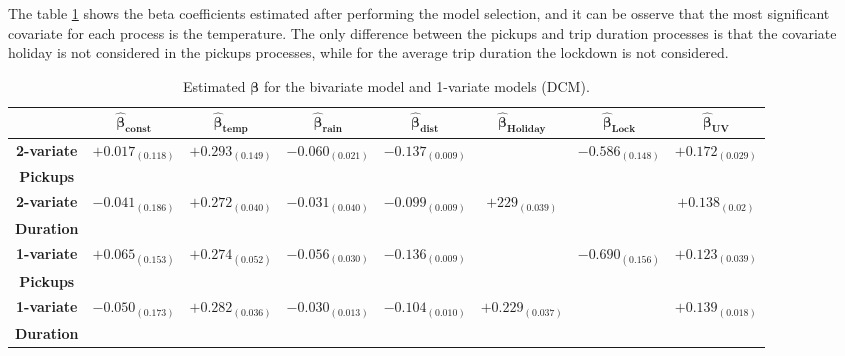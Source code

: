 The table \ref{beta coefficients} shows the beta coefficients estimated after performing the model selection, and it can be osserve that the most significant covariate for each process is the temperature. The only difference between the pickups and trip duration processes is that the covariate holiday is not considered in the pickups processes, while for the average trip duration the lockdown is not considered.
 \begin{table}[h!]
	\centering
	\renewcommand\arraystretch{1.3}
	\begin{tabular}{c|c|c|c|c|c|c|c}
		\hline
		\textit{} & $\boldsymbol{\hat{\beta}_{const}}$  & $\boldsymbol{\hat{\beta}_{temp}}$ & $\boldsymbol{\hat{\beta}_{rain}}$ & $\boldsymbol{\hat{\beta}_{dist}}$ & $\boldsymbol{\hat{\beta}_{Holiday}}$ & $\boldsymbol{\hat{\beta}_{Lock}}$ & $\boldsymbol{\hat{\beta}_{UV}}$ \\
		\hline
		\textbf{2-variate} & {\fontsize{3mm}{4mm}$+0.017_{(0.118)}$} & {\fontsize{3mm}{4mm}$+0.293_{(0.149)}$}  & {\fontsize{3mm}{4mm}$-0.060_{(0.021)}$} &	 {\fontsize{3mm}{4mm}$-0.137_{(0.009)}$} &  & {\fontsize{3mm}{4mm}$-0.586_{(0.148)}$} & {\fontsize{3mm}{4mm}$+0.172_{(0.029)}$}  \\
		\textbf{Pickups} & &  &  & & & &  \\
		\hline
		\textbf{2-variate} & {\fontsize{3mm}{4mm}$-0.041_{(0.186)}$} & {\fontsize{3mm}{4mm}$+0.272_{(0.040)}$}  & {\fontsize{3mm}{4mm}$-0.031_{(0.040)}$} &	 {\fontsize{3mm}{4mm}$-0.099_{(0.009)}$} & {\fontsize{3mm}{4mm}$+229_{(0.039)}$} &  & {\fontsize{3mm}{4mm}$+0.138_{(0.02)}$}  \\
		\textbf{Duration} &  & & & & & &  \\
		\hline
		\textbf{1-variate}  &{\fontsize{3mm}{4mm}$+0.065_{(0.153)}$} & {\fontsize{3mm}{4mm}$+0.274_{(0.052)}$}  & {\fontsize{3mm}{4mm}$-0.056_{(0.030)}$} &	 {\fontsize{3mm}{4mm}$-0.136_{(0.009)}$} &  & {\fontsize{3mm}{4mm}$-0.690_{(0.156)}$} & {\fontsize{3mm}{4mm}$+0.123_{(0.039)}$}  \\
		\textbf{Pickups} & & & & & & &  \\
		\hline
		\textbf{1-variate} & {\fontsize{3mm}{4mm}$-0.050_{(0.173)}$} & {\fontsize{3mm}{4mm}$+0.282_{(0.036)}$}  & {\fontsize{3mm}{4mm}$-0.030_{(0.013)}$} &	 {\fontsize{3mm}{4mm}$-0.104_{(0.010)}$} & {\fontsize{3mm}{4mm}$+0.229_{(0.037)}$}  &  & {\fontsize{3mm}{4mm}$+0.139_{(0.018)}$}  \\
		\textbf{Duration} &  &  &  & & & &  \\
		\hline

	\end{tabular}
	\caption[Estimated $\boldsymbol{\beta}$ for the bivariate model and 1-variate models (DCM).]{Estimated $\boldsymbol{\beta}$ for the bivariate model and 1-variate models (DCM).}
	\label{beta coefficients}
\end{table}
\noindent

